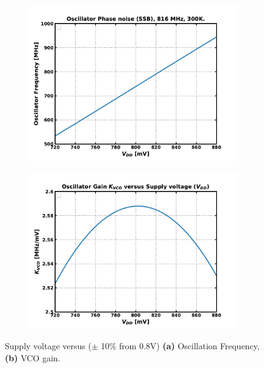 	\begin{figure}[htb!]
	    \centering
	    \begin{subfigure}{0.5\textwidth}
	        \centering
	        \includegraphics[width=1\textwidth, angle=0]{./figs/results/osc_f_vs_vdd}
	        \caption{ }
	        \label{fig:osc_f_vs_vdd}
	    \end{subfigure}%
	    \begin{subfigure}{0.5\textwidth}
	        \centering
	        \includegraphics[width=1\textwidth, angle=0]{./figs/results/osc_f_gain_vs_vdd}
	        \caption{ }
	        \label{fig:osc_f_gain_vs_vdd}
	    \end{subfigure}
	    \label{fig:osc_f_vdd}
	    \caption{Supply voltage versus ($\pm$ 10\% from 0.8V) \textbf{(a)} Oscillation Frequency, \textbf{(b)} VCO gain.}
	\end{figure} 

